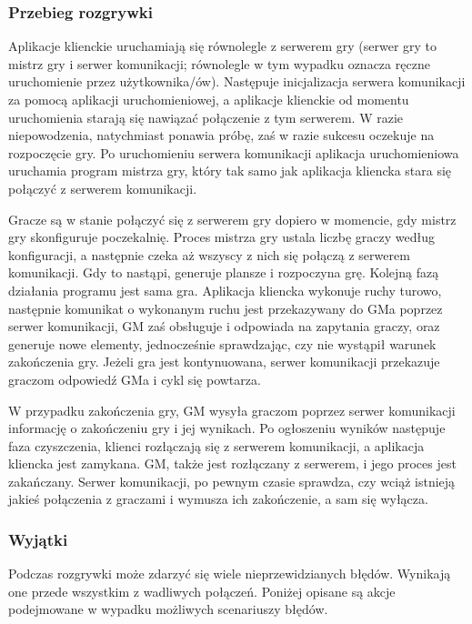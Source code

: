 \documentclass[11pt]{article}
\let\Oldsubsubsection\subsubsection
\renewcommand{\subsubsection}{\FloatBarrier\Oldsubsubsection}
\begin{document}
\subsubsection{Przebieg rozgrywki}
\par
Aplikacje klienckie uruchamiają się równolegle z serwerem gry (serwer gry to mistrz gry i serwer komunikacji; równolegle w tym wypadku oznacza ręczne uruchomienie przez użytkownika/ów). Następuje inicjalizacja serwera komunikacji za pomocą aplikacji uruchomieniowej, a aplikacje klienckie od momentu uruchomienia starają się nawiązać połączenie z tym serwerem. W razie niepowodzenia, natychmiast ponawia próbę, zaś w razie sukcesu oczekuje na rozpoczęcie gry. Po uruchomieniu serwera komunikacji aplikacja uruchomieniowa uruchamia program mistrza gry, który tak samo jak aplikacja kliencka stara się połączyć z serwerem komunikacji.
\par
Gracze są w stanie połączyć się z serwerem gry dopiero w momencie, gdy mistrz gry skonfiguruje poczekalnię.
Proces mistrza gry ustala liczbę graczy według konfiguracji, a następnie czeka aż wszyscy z nich się połączą z serwerem komunikacji. Gdy to nastąpi, generuje plansze i rozpoczyna grę. Kolejną fazą działania programu jest sama gra. Aplikacja kliencka wykonuje ruchy turowo, następnie komunikat o wykonanym ruchu jest przekazywany do GMa poprzez serwer komunikacji, GM zaś obsługuje i odpowiada na zapytania graczy, oraz generuje nowe elementy, jednocześnie sprawdzając, czy nie wystąpił warunek zakończenia gry. Jeżeli gra jest kontynuowana, serwer komunikacji przekazuje graczom odpowiedź GMa i cykl się powtarza.
\par
W przypadku zakończenia gry, GM wysyła graczom poprzez serwer komunikacji informację o zakończeniu gry i jej wynikach. Po ogłoszeniu wyników następuje faza czyszczenia, klienci rozłączają się z serwerem komunikacji, a aplikacja kliencka jest zamykana. GM, także jest rozłączany z serwerem, i jego proces jest zakańczany. Serwer komunikacji, po pewnym czasie sprawdza, czy wciąż istnieją jakieś połączenia z graczami i wymusza ich zakończenie, a sam się wyłącza.



\subsubsection{Wyjątki}
\par
Podczas rozgrywki może zdarzyć się wiele nieprzewidzianych błędów. Wynikają one przede wszystkim z wadliwych połączeń. Poniżej opisane są akcje podejmowane w wypadku możliwych scenariuszy błędów.
\end{document}
